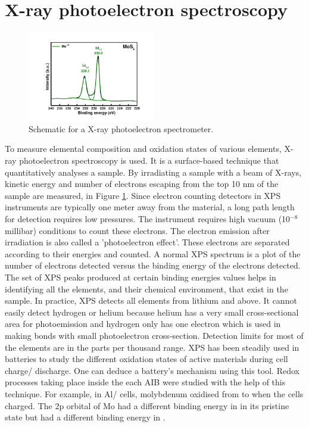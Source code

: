 \section{X-ray photoelectron spectroscopy}
\begin{figure}[tbh!]
\centering
\includegraphics[width=0.5\textwidth]{Figures/chap2fig/XPS}
\caption{Schematic for a X-ray photoelectron spectrometer.}
\label{Figures/chap2fig:XPS}
\end{figure}
To measure elemental composition and oxidation states of various elements, X-ray photoelectron spectroscopy is used. It is a surface-based technique that quantitatively analyses a sample. By irradiating a sample with a beam of X-rays, kinetic energy and number of electrons escaping from the top 10 nm of the sample are measured, in Figure \ref{Figures/chap2fig:XPS}. Since  electron counting detectors in XPS instruments are typically one meter away from the material, a long path length for detection requires low pressures. The instrument requires high vacuum (10$^{-8}$ millibar) conditions to count these electrons. The electron emission after irradiation is also called a 'photoelectron effect'. These electrons are separated according to their energies and counted. A normal XPS spectrum is a plot of the number of electrons detected versus the binding energy of the electrons detected. The set of XPS peaks produced at certain binding energies values helps in identifying all the elements, and their chemical environment, that exist in the sample. In practice, XPS detects all elements from lithium and above. It cannot easily detect hydrogen or helium because helium has a very small cross-sectional area for photoemission and hydrogen only has one electron which is used in making bonds with  small photoelectron cross-section. Detection limits for most of the elements are in the parts per thousand range. XPS has been steadily used in batteries to study the different oxidation states of active materials during cell charge/ discharge. One can deduce a battery's mechanism using this tool.
Redox processes taking place inside the each AIB were studied with the help of this technique. For example, in Al/ cells, molybdenum oxidised from  to  when the cells charged. The 2p orbital of Mo had a different binding energy in  in its pristine state but had a different binding energy in . 

